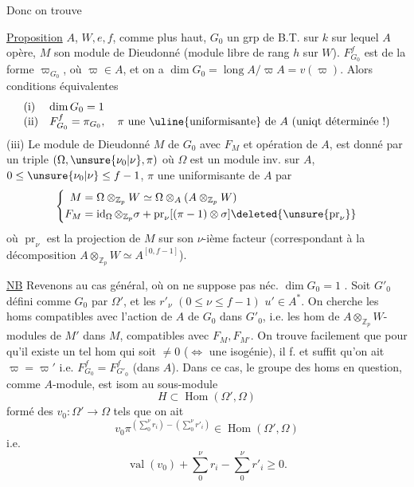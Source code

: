 
Donc  on trouve

\uline{Proposition} $A$,  $W,e,f$,  comme plus haut, $G_0$ un grp de B.T.  sur  $k$ sur lequel $A$ opère,  $M$ son module de Dieudonné (module libre de rang $h$ sur $W$).
$F_{G_0}^f$ est de la forme $\varpi_{G_0}$, où $\varpi\in A$, et on a $\dim G_0=\operatorname{long}A/\varpi A=v(\varpi)$.
Alors  conditions équivalentes
\[
\begin{array}{ll}
\text{(i)}&\dim G_0=1\\
\text{(ii)}&F_{G_0}^f=\pi_{G_0},\quad\pi\ \text{une \uline{uniformisante} de }A\ \text{(uniqt déterminée !)}
\end{array}
\]
(iii) Le module de Dieudonné $M$ de $G_0$  avec $F_M$ et opération de $A$, est donné par un triple $(\Omega,\unsure{\nu_0|\nu},\pi)$ où $\Omega$ est un module inv. sur $A$, $0\leq\unsure{\nu_0|\nu}\leq f-1$, $\pi$ une uniformisante de $A$ par
\[
\left\{\begin{aligned}
M&=\Omega\otimes_{\mathbb Z_p}W\simeq\Omega\otimes_A(A\otimes_{\mathbb Z_p}W)\\
F_M&=\operatorname{id}_\Omega\otimes_{\mathbb Z_p}\sigma+\operatorname{pr}_\nu[(\pi-1)\otimes\sigma]\deleted{\unsure{\operatorname{pr}_\nu}}
\end{aligned}\right.
\]
où $\operatorname{pr}_\nu$ est la  projection de $M$ sur son $\nu$-ième facteur  (correspondant à la décomposition $A\otimes_{\mathbb Z_p}W\simeq A^{[0,f-1]}$).


\uline{NB} Revenons au cas général, où on ne suppose pas néc. $\dim G_0=1$ . Soit $G'_0$ défini comme $G_0$ par $\Omega'$, et les $r'_\nu$ $(0\leq\nu\leq f-1)$ $u'\in A^*$. On cherche les homs compatibles avec l'action de $A$ de $G_0$ dans $G'_0$, i.e. les hom de $A\otimes_{\mathbb Z_p}W$-modules de $M'$ dans $M$, compatibles avec $F_M,F_{M'}$. On trouve facilement que pour qu'il existe un tel hom qui soit $\ne0$ ($\Longleftrightarrow$ une isogénie), il f. et suffit qu'on ait $\varpi=\varpi'$ i.e. $F_{G_0}^f=F_{G'_0}^f$ (dans $A$). Dans ce cas, le groupe des homs en question, comme $A$-module, est isom au  sous-module
\[
H\subset\operatorname{Hom}(\Omega',\Omega)
\]
formé des $v_0:\Omega'\longrightarrow\Omega$ tels que  on ait
\[
v_0\pi^{(\sum_0^\nu r_i)-(\sum_0^\nu r'_i)}\in\operatorname{Hom}(\Omega',\Omega)
\]
i.e.
\[
\operatorname{val}(v_0)+\sum_0^\nu r_i-\sum_0^\nu r'_i\geq0.
\]
